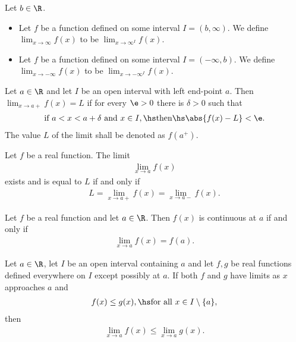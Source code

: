 \documentclass{article}
\begin{document}
\begin{definition}
	Let $b\in\R$.
	\begin{itemize}
		\item Let $f$ be a function defined on some interval $I=(b,\infty)$.
		      We define $\lim_{x\to\infty}f(x)$ to be $\lim_{x\to\infty^I}f(x)$.
		\item Let $f$ be a function defined on some interval $I=(-\infty, b)$.
		      We define $\lim_{x\to-\infty}f(x)$ to be $\lim_{x\to-\infty^I}f(x).$
	\end{itemize}
\end{definition}

\begin{theorem}
	Let $a\in\R$ and let $I$ be an open interval with left end-point
	$a$. Then $\lim_{x\to a+} f(x)=L$ if for every $\e>0$ there is
	$\delta>0$ such that
	\begin{align*}
		\text{if } a<x<a+\delta \text{ and }x\in I,\hs
		\text{then}\hs \abs{f(x)-L}<\e.
	\end{align*}
	The value $L$ of the limit shall be denoted as $f(a^+)$.
\end{theorem}

\begin{theorem}
	Let $f$ be a real function. The limit
	\begin{align*}
		\lim_{x\to a}f(x)
	\end{align*}
	exists and is equal to $L$ if and only if
	\begin{align*}
		L=\lim_{x\to a+}f(x)=\lim_{x\to a-}f(x).
	\end{align*}
\end{theorem}

\begin{proposition}
	Let $f$ be a real function and let $a\in\R$. Then
	$f(x)$ is continuous at $a$ if and only if
	\begin{align*}
		\lim_{x\to a}f(x)=f(a).
	\end{align*}
\end{proposition}

\setcounter{theorem}{9}
\begin{theorem}
	Let $a\in\R$, let $I$ be an open interval containing
	$a$ and let $f,g$ be real functions defined everywhere
	on $I$ except possibly at $a$. If both $f$ and $g$ have
	limits as $x$ approaches $a$ and
	\begin{align*}
		f(x)\leq g(x),\hs\text{for all }x\in I\setminus\{a\},
	\end{align*}
	then
	\begin{align*}
		\lim_{x\to a}f(x)\leq\lim_{x\to a} g(x).
	\end{align*}
\end{theorem}
\end{document}
